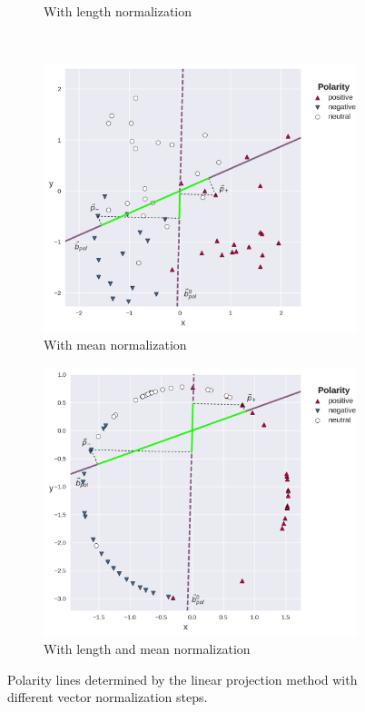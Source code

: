 \begin{figure}[hbt!]
{\begin{subfigure}{.5\textwidth}
      \caption{With length normalization}\label{snt-lex:fig:nwe-len-norm}
    \end{subfigure}\\
    \begin{subfigure}{.5\textwidth}
      \centering
      \includegraphics[width=\linewidth]{img/sentilex_polarity_mean_normed.png}
      \caption{With mean normalization}\label{snt-lex:fig:nwe-mean-norm}
    \end{subfigure}%
    \begin{subfigure}{.5\textwidth}
      \centering
      \includegraphics[width=\linewidth]{img/sentilex_polarity_len_mean_normed.png}
      \caption{With length and mean normalization}\label{snt-lex:fig:nwe-mean-len-mean-norm}
    \end{subfigure}
  }
  \caption{Polarity lines determined by the linear projection method
    with different vector
    normalization steps.}\label{snt-lex:fig:nwe-norms}
\end{figure}

